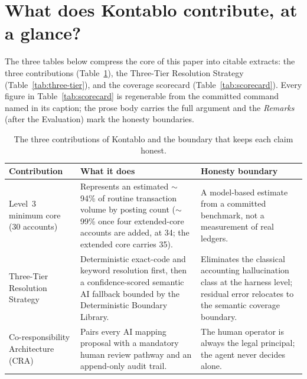 \section{What does Kontablo contribute, at a glance?}
\label{sec:signature-tables}

The three tables below compress the core of this paper into citable extracts: the
three contributions (Table~\ref{tab:contributions}), the Three-Tier Resolution
Strategy (Table~\ref{tab:three-tier}), and the coverage scorecard
(Table~\ref{tab:scorecard}). Every figure in Table~\ref{tab:scorecard} is
regenerable from the committed command named in its caption; the prose body
carries the full
argument and the \emph{Remarks} (after the Evaluation) mark the honesty
boundaries.

\begin{table}[H]
\centering
\small
\begin{tabular}{p{2.9cm} p{5.4cm} p{4.6cm}}
\toprule
\textbf{Contribution} & \textbf{What it does} & \textbf{Honesty boundary} \\
\midrule
Level~3 minimum core (30 accounts) &
Represents an estimated $\sim$94\% of routine transaction volume by posting count
($\sim$99\% once four extended-core accounts are added, at 34; the extended
core carries 35). &
A model-based estimate from a committed benchmark, not a measurement of real
ledgers. \\
\addlinespace
Three-Tier Resolution Strategy &
Deterministic exact-code and keyword resolution first, then a confidence-scored
semantic AI fallback bounded by the Deterministic Boundary Library. &
Eliminates the classical accounting hallucination class at the harness level;
residual error relocates to the semantic coverage boundary. \\
\addlinespace
Co-responsibility Architecture (CRA) &
Pairs every AI mapping proposal with a mandatory human review pathway and an
append-only audit trail. &
The human operator is always the legal principal; the agent never decides
alone. \\
\bottomrule
\end{tabular}
\caption{The three contributions of Kontablo and the boundary that keeps each
claim honest.}
\label{tab:contributions}
\end{table}

